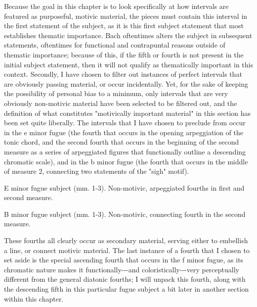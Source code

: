 Because the goal in this chapter is to look specifically at how
intervals are featured as purposeful, motivic material, the pieces must
contain this interval in the first statement of the subject, as it is
this first subject statement that most establishes thematic importance.
Bach oftentimes alters the subject in subsequent statements, oftentimes
for functional and contrapuntal reasons outside of thematic importance;
because of this, if the fifth or fourth is not present in the initial
subject statement, then it will not qualify as thematically important in
this context. Secondly, I have chosen to filter out instances of perfect
intervals that are obviously passing material, or occur incidentally.
Yet, for the sake of keeping the possibility of personal bias to a
minimum, only intervals that are very obviously non-motivic material
have been selected to be filtered out, and the definition of what
constitutes "motivically important material" in this section has been
set quite liberally. The intervals that I have chosen to preclude from
occur in the e minor fugue (the fourth that occurs in the opening
arpeggiation of the tonic chord, and the second fourth that occurs in
the beginning of the second measure as a series of arpeggiated figures
that functionally outline a descending chromatic scale), and in the b
minor fugue (the fourth that occurs in the middle of measure 2,
connecting two statements of the "sigh" motif).



\begin{Example}[H]
    \begin{center}
    \caption[E minor fugue subject (mm. 1-3). ]{ E minor fugue subject (mm. 1-3). Non-motivic, arpeggiated fourths in first and second measure.}
    \end{center}
\end{Example}
    


\begin{Example}[H]
    \begin{center}
    \caption[B minor fugue subject (mm. 1-3). ]{ B minor fugue subject (mm. 1-3). Non-motivic, connecting fourth in the second measure.}
    \end{center}
\end{Example}
    
    These fourths all clearly occur as secondary material, serving either to
embellish a line, or connect motivic material. The last instance of a
fourth that I chosen to set aside is the special ascending fourth that
occurs in the f minor fugue, as its chromatic nature makes it
functionally-\/-\/-and coloristically-\/-\/-very perceptually different
from the general diatonic fourths; I will unpack this fourth, along with
the descending fifth in this particular fugue subject a bit later in
another section within this chapter.



